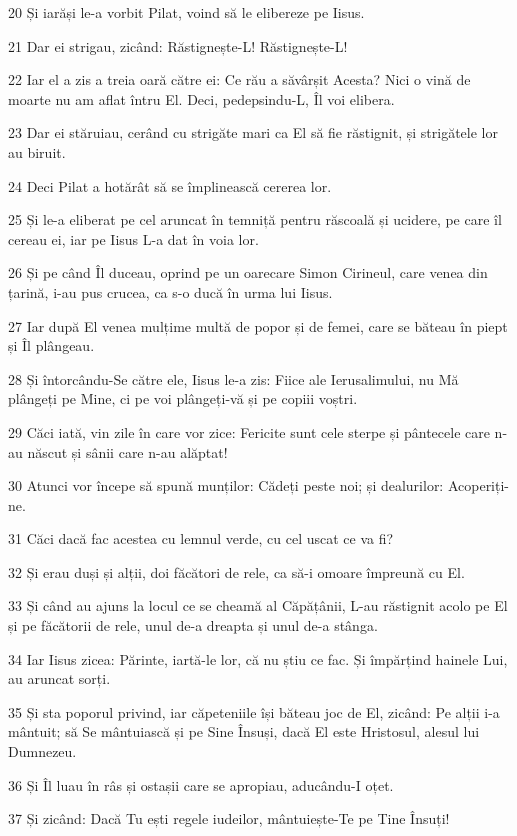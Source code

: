 \par 20 Și iarăși le-a vorbit Pilat, voind să le elibereze pe Iisus.
\par 21 Dar ei strigau, zicând: Răstignește-L! Răstignește-L!
\par 22 Iar el a zis a treia oară către ei: Ce rău a săvârșit Acesta? Nici o vină de moarte nu am aflat întru El. Deci, pedepsindu-L, Îl voi elibera.
\par 23 Dar ei stăruiau, cerând cu strigăte mari ca El să fie răstignit, și strigătele lor au biruit.
\par 24 Deci Pilat a hotărât să se împlinească cererea lor.
\par 25 Și le-a eliberat pe cel aruncat în temniță pentru răscoală și ucidere, pe care îl cereau ei, iar pe Iisus L-a dat în voia lor.
\par 26 Și pe când Îl duceau, oprind pe un oarecare Simon Cirineul, care venea din țarină, i-au pus crucea, ca s-o ducă în urma lui Iisus.
\par 27 Iar după El venea mulțime multă de popor și de femei, care se băteau în piept și Îl plângeau.
\par 28 Și întorcându-Se către ele, Iisus le-a zis: Fiice ale Ierusalimului, nu Mă plângeți pe Mine, ci pe voi plângeți-vă și pe copiii voștri.
\par 29 Căci iată, vin zile în care vor zice: Fericite sunt cele sterpe și pântecele care n-au născut și sânii care n-au alăptat!
\par 30 Atunci vor începe să spună munților: Cădeți peste noi; și dealurilor: Acoperiți-ne.
\par 31 Căci dacă fac acestea cu lemnul verde, cu cel uscat ce va fi?
\par 32 Și erau duși și alții, doi făcători de rele, ca să-i omoare împreună cu El.
\par 33 Și când au ajuns la locul ce se cheamă al Căpățânii, L-au răstignit acolo pe El și pe făcătorii de rele, unul de-a dreapta și unul de-a stânga.
\par 34 Iar Iisus zicea: Părinte, iartă-le lor, că nu știu ce fac. Și împărțind hainele Lui, au aruncat sorți.
\par 35 Și sta poporul privind, iar căpeteniile își băteau joc de El, zicând: Pe alții i-a mântuit; să Se mântuiască și pe Sine Însuși, dacă El este Hristosul, alesul lui Dumnezeu.
\par 36 Și Îl luau în râs și ostașii care se apropiau, aducându-I oțet.
\par 37 Și zicând: Dacă Tu ești regele iudeilor, mântuiește-Te pe Tine Însuți!
